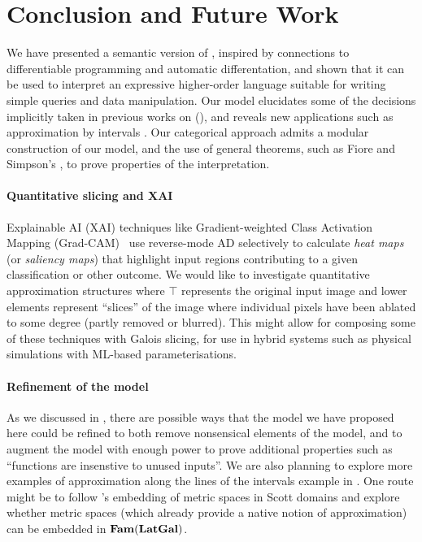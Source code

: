 \section{Conclusion and Future Work}
\label{sec:conclusion}

We have presented a semantic version of \GPS, inspired by connections to differentiable programming and
automatic differentation, and shown that it can be used to interpret an expressive higher-order language
suitable for writing simple queries and data manipulation. Our model elucidates some of the decisions
implicitly taken in previous works on \GPS (), and reveals new applications such as
approximation by intervals . Our categorical approach admits a modular construction of
our model, and the use of general theorems, such as Fiore and Simpson's , to prove
properties of the interpretation.

\paragraph{Quantitative slicing and XAI}  Explainable AI (XAI) techniques like Gradient-weighted Class
Activation Mapping (Grad-CAM)~\cite{selvaraju20} use reverse-mode AD selectively to calculate \emph{heat maps}
(or \emph{saliency maps}) that highlight input regions contributing to a given classification or other
outcome. We would like to investigate quantitative approximation structures where $\top$ represents the
original input image and lower elements represent ``slices'' of the image where individual pixels have been
ablated to some degree (partly removed or blurred). This might allow for composing some of these techniques
with Galois slicing, for use in hybrid systems such as physical simulations with ML-based parameterisations.

\paragraph{Refinement of the model} As we discussed in , there are possible ways
that the model we have proposed here could be refined to both remove nonsensical elements of the model, and to
augment the model with enough power to prove additional properties such as ``functions are insenstive to
unused inputs''. We are also planning to explore more examples of approximation along the lines of the
intervals example in . One route might be to follow \citet{edalat-heckmann98}'s
embedding of metric spaces in Scott domains and explore whether metric spaces (which already provide a native
notion of approximation) can be embedded in $\mathbf{Fam}(\mathbf{LatGal})$.

